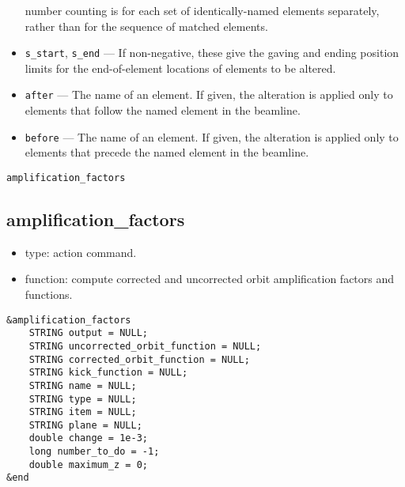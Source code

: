 \documentclass[11pt]{article}
\begin{document}
\begin{itemize}
 number counting is for each set of identically-named elements separately, rather than for the sequence
 of matched elements.
\item \verb|s_start|, \verb|s_end| --- If non-negative, these give the gaving and ending position
 limits for the end-of-element locations of elements to be altered.
\item \verb|after| --- The name of an element.  If given, the alteration is applied only to elements
 that follow the named element in the beamline.  
\item \verb|before| --- The name of an element.  If given, the alteration is applied only to elements
 that precede the named element in the beamline. 
\end{itemize}

\begin{latexonly}
\newpage
\begin{center}{\Large\verb|amplification_factors|}\end{center}
\end{latexonly}
\subsection{amplification\_factors \label{subsec:amplificationfactors}}

\begin{itemize}
\item type: action command.
\item function: compute corrected and uncorrected orbit amplification factors and functions.
\end{itemize}

\begin{verbatim}
&amplification_factors
    STRING output = NULL;
    STRING uncorrected_orbit_function = NULL;
    STRING corrected_orbit_function = NULL;
    STRING kick_function = NULL;
    STRING name = NULL;
    STRING type = NULL;
    STRING item = NULL;
    STRING plane = NULL;
    double change = 1e-3;
    long number_to_do = -1;
    double maximum_z = 0;
&end
\end{verbatim}
\end{document}
